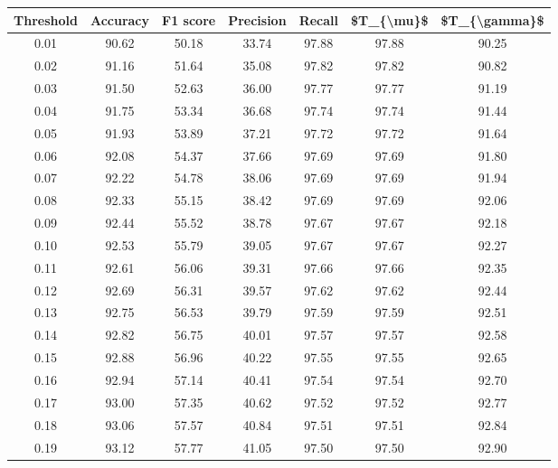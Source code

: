 \begin{tabular}{|c|c|c|c|c|c|c|}
\hline
 Threshold &  Accuracy &  F1 score &  Precision &  Recall &  \$T\_\{\textbackslash mu\}\$ &  \$T\_\{\textbackslash gamma\}\$ \\
\hline
      0.01 &     90.62 &     50.18 &      33.74 &   97.88 &      97.88 &         90.25 \\
      0.02 &     91.16 &     51.64 &      35.08 &   97.82 &      97.82 &         90.82 \\
      0.03 &     91.50 &     52.63 &      36.00 &   97.77 &      97.77 &         91.19 \\
      0.04 &     91.75 &     53.34 &      36.68 &   97.74 &      97.74 &         91.44 \\
      0.05 &     91.93 &     53.89 &      37.21 &   97.72 &      97.72 &         91.64 \\
      0.06 &     92.08 &     54.37 &      37.66 &   97.69 &      97.69 &         91.80 \\
      0.07 &     92.22 &     54.78 &      38.06 &   97.69 &      97.69 &         91.94 \\
      0.08 &     92.33 &     55.15 &      38.42 &   97.69 &      97.69 &         92.06 \\
      0.09 &     92.44 &     55.52 &      38.78 &   97.67 &      97.67 &         92.18 \\
      0.10 &     92.53 &     55.79 &      39.05 &   97.67 &      97.67 &         92.27 \\
      0.11 &     92.61 &     56.06 &      39.31 &   97.66 &      97.66 &         92.35 \\
      0.12 &     92.69 &     56.31 &      39.57 &   97.62 &      97.62 &         92.44 \\
      0.13 &     92.75 &     56.53 &      39.79 &   97.59 &      97.59 &         92.51 \\
      0.14 &     92.82 &     56.75 &      40.01 &   97.57 &      97.57 &         92.58 \\
      0.15 &     92.88 &     56.96 &      40.22 &   97.55 &      97.55 &         92.65 \\
      0.16 &     92.94 &     57.14 &      40.41 &   97.54 &      97.54 &         92.70 \\
      0.17 &     93.00 &     57.35 &      40.62 &   97.52 &      97.52 &         92.77 \\
      0.18 &     93.06 &     57.57 &      40.84 &   97.51 &      97.51 &         92.84 \\
      0.19 &     93.12 &     57.77 &      41.05 &   97.50 &      97.50 &         92.90 \\

\end{tabular}
